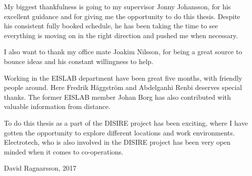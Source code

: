 

My biggest thankfulness is going to my supervisor Jonny Johansson, for his excellent guidance and for giving me the opportunity to do this thesis. Despite his consistent fully booked schedule, he has been taking the time to see everything is moving on in the right direction and pushed me when necessary. 

I also want to thank my office mate Joakim Nilsson, for being a great source to bounce ideas and his constant willingness to help.

Working in the EISLAB department have been great five months, with friendly people around. Here Fredrik H\"{a}ggstr\"{o}m and Abdelganhi Renbi deserves special thanks. The former EISLAB member Johan Borg has also contributed with valuable information from distance.

To do this thesis as a part of the DISIRE project has been exciting, where I have gotten the opportunity to explore different locations and work environments. Electrotech, who is also involved in the DISIRE project has been very open minded when it comes to co-operations.%




\vspace*{2cm}%
\hfill David Ragnarsson, 2017